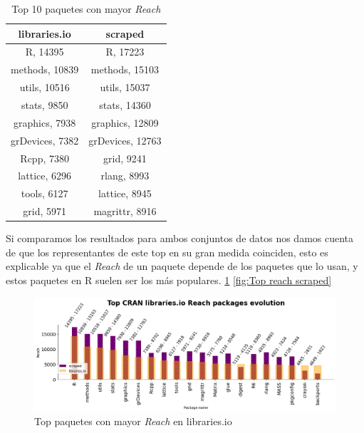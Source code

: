 \begin{table}[ht!]
    \begin{center}
        \begin{tabular}{|c|c|}
            \hline
            \textbf{libraries.io} & \textbf{scraped} \\
            \hline
            R, 14395              & R, 17223         \\
            methods, 10839        & methods, 15103   \\
            utils, 10516          & utils, 15037     \\
            stats, 9850           & stats, 14360     \\
            graphics, 7938        & graphics, 12809  \\
            grDevices, 7382       & grDevices, 12763 \\
            Rcpp, 7380            & grid, 9241       \\
            lattice, 6296         & rlang, 8993      \\
            tools, 6127           & lattice, 8945    \\
            grid, 5971            & magrittr, 8916   \\
            \hline
        \end{tabular}
        \caption{Top 10 paquetes con mayor \textit{Reach}}
        \label{tab:Top 10 paquetes con mayor Reach}
    \end{center}
\end{table}

Si comparamos los resultados para ambos conjuntos de datos nos damos cuenta de que
los representantes de este top en su gran medida coinciden, esto es explicable ya que
el \textit{Reach} de un paquete depende de los paquetes que lo usan, y estos paquetes
en R suelen ser los más populares. \ref{fig:Top reach libraries.io} \ref{fig:Top reach scraped}


\begin{figure}[ht!]
    \begin{center}
        \includegraphics[width=1\textwidth]{img/cran/reach_top.png}
        \caption{Top paquetes con mayor \textit{Reach} en libraries.io}
        \label{fig:Top reach libraries.io}
    \end{center}
\end{figure}

